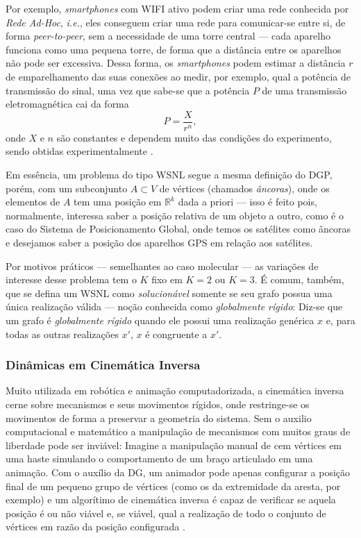 Por exemplo, \textit{smartphones} com WIFI ativo podem criar uma rede conhecida por \textit{Rede Ad-Hoc}, \textit{i.e.}, eles conseguem criar uma rede para comunicar-se entre si, de forma \textit{peer-to-peer}, sem a necessidade de uma torre central --- cada aparelho funciona como uma pequena torre, de forma que a distância entre os aparelhos não pode ser excessiva.
Dessa forma, os \textit{smartphones} podem estimar a distância $r$ de emparelhamento das suas conexões ao medir, por exemplo, qual a potência de transmissão do sinal, uma vez que sabe-se que a potência $P$ de uma transmissão eletromagnética cai da forma 
\begin{equation}
	P = \frac{X}{r^n},
\end{equation}
onde $X$ e $n$ são constantes e dependem muito das condições do experimento, sendo obtidas experimentalmente \cite{savvides2001dynamic}.

Em essência, um problema do tipo WSNL segue a mesma definição do DGP, porém, com um subconjunto $A\subset V$ de vértices (chamados \textit{âncoras}), onde os elementos de $A$ tem uma posição em $\mathbb{R}^k$ dada a priori --- isso é feito pois, normalmente, interessa saber a posição relativa de um objeto a outro, como é o caso do Sistema de Posicionamento Global, onde temos os satélites como âncoras e desejamos saber a posição dos aparelhos GPS em relação aos satélites.

Por motivos práticos --- semelhantes ao caso molecular --- as variações de interesse desse problema tem o $K$ fixo em $K= 2$ ou $K=3$. É comum, também, que se defina um WSNL como \textit{solucionável} somente se seu grafo possua uma única realização válida \cite{libertiEDG} --- noção conhecida como \textit{globalmente rígido}: Diz-se que um grafo é \textit{globalmente rígido} quando ele possui uma realização genérica $x$ e, para todas as outras realizações $x'$, $x$ é congruente a $x'$. 

\subsubsection{Dinâmicas em Cinemática Inversa}

Muito utilizada em robótica e animação computadorizada, a cinemática inversa cerne sobre mecanismos e seus movimentos rígidos, onde restringe-se os movimentos de forma a preservar a geometria do sistema. Sem o auxilio computacional e matemático a manipulação de mecanismos com muitos graus de liberdade  pode ser inviável: Imagine a manipulação manual de cem vértices em uma haste simulando o comportamento de um braço articulado em uma animação. Com o auxílio da DG, um animador pode apenas configurar a posição final de um pequeno grupo de vértices (como os da extremidade da aresta, por exemplo) e um algorítimo de cinemática inversa é capaz de verificar se aquela posição é ou não viável e, se viável, qual a realização de todo o conjunto de vértices em razão da posição configurada \cite{cinematicaInversa}.

